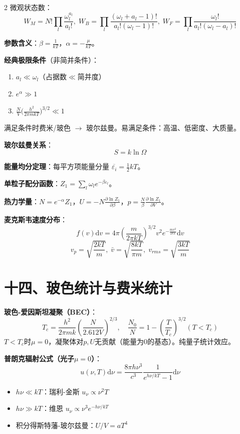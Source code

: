 \documentclass[10pt,a4paper,fontset=mac]{ctexart}
\newcommand{\dd}{\mathrm{d}}
\newcommand{\đ}{\mathrm{đ}}
\begin{document}
\begin{multicols}{2}
微观状态数：
\[
W_M=N!\prod_l\frac{\omega_l^{a_l}}{a_l!},\;
W_B=\prod_l\frac{(\omega_l+a_l-1)!}{a_l!(\omega_l-1)!},\;
W_F=\prod_l\frac{\omega_l!}{a_l!(\omega_l-a_l)!}
\]

\textbf{参数含义}：$\boxed{\beta=\frac{1}{kT}}$，$\boxed{\alpha=-\frac{\mu}{kT}}$。

\textbf{经典极限条件}（非简并条件）：
\begin{enumerate}
\item $a_l\ll\omega_l$（占据数$\ll$简并度）
\item $e^\alpha\gg1$
\item $\frac{N}{V}\big(\frac{h^2}{2\pi mkT}\big)^{3/2}\ll1$
\end{enumerate}
满足条件时费米/玻色 $\to$ 玻尔兹曼。易满足条件：高温、低密度、大质量。

\textbf{玻尔兹曼关系}：
\[
\boxed{S=k\ln\Omega}
\]

\textbf{能量均分定理}：每平方项能量分量 $\overline{\varepsilon_i}=\frac{1}{2}kT$。

\textbf{单粒子配分函数}：$Z_1=\sum_l\omega_le^{-\beta\varepsilon_l}$。

\textbf{热力学量}：$N=e^{-\alpha}Z_1$，$U=-N\frac{\partial\ln Z_1}{\partial\beta}$，$p=\frac{N}{\beta}\frac{\partial\ln Z_1}{\partial V}$。

\textbf{麦克斯韦速度分布}：
\[
f(v)\dd v=4\pi\!\left(\frac{m}{2\pi kT}\right)^{3/2}\!v^2e^{-\frac{mv^2}{2kT}}\dd v
\]
\[
v_p=\sqrt{\frac{2kT}{m}},\;\bar{v}=\sqrt{\frac{8kT}{\pi m}},\;v_{rms}=\sqrt{\frac{3kT}{m}}
\]

\section*{十四、玻色统计与费米统计}

\textbf{玻色-爱因斯坦凝聚（BEC）}：
\[
T_c=\frac{h^2}{2\pi mk}\!\left(\frac{N}{2.612V}\right)^{2/3},\quad
\frac{N_0}{N}=1-\!\left(\frac{T}{T_c}\right)^{3/2}\!(T<T_c)
\]
$T<T_c$时$\mu=0$，凝聚体对$p,U$无贡献（能量为0的基态）。纯量子统计效应。

\textbf{普朗克辐射公式（光子$\mu=0$）}：
\[
\boxed{u(\nu,T)\dd\nu=\frac{8\pi h\nu^3}{c^3}\frac{1}{e^{h\nu/kT}-1}\dd\nu}
\]
\begin{itemize}
\item $h\nu\ll kT$：瑞利-金斯 $u_\nu\propto\nu^2T$
\item $h\nu\gg kT$：维恩 $u_\nu\propto\nu^3e^{-h\nu/kT}$
\item 积分得斯特藩-玻尔兹曼：$U/V=aT^4$
\end{itemize}


\end{multicols}
\end{document}
